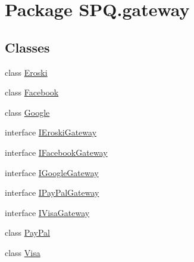 \hypertarget{namespace_s_p_q_1_1gateway}{}\section{Package S\+P\+Q.\+gateway}
\label{namespace_s_p_q_1_1gateway}
\subsection*{Classes}
\begin{DoxyCompactItemize}
\item 
class \mbox{\hyperlink{class_s_p_q_1_1gateway_1_1_eroski}{Eroski}}
\item 
class \mbox{\hyperlink{class_s_p_q_1_1gateway_1_1_facebook}{Facebook}}
\item 
class \mbox{\hyperlink{class_s_p_q_1_1gateway_1_1_google}{Google}}
\item 
interface \mbox{\hyperlink{interface_s_p_q_1_1gateway_1_1_i_eroski_gateway}{I\+Eroski\+Gateway}}
\item 
interface \mbox{\hyperlink{interface_s_p_q_1_1gateway_1_1_i_facebook_gateway}{I\+Facebook\+Gateway}}
\item 
interface \mbox{\hyperlink{interface_s_p_q_1_1gateway_1_1_i_google_gateway}{I\+Google\+Gateway}}
\item 
interface \mbox{\hyperlink{interface_s_p_q_1_1gateway_1_1_i_pay_pal_gateway}{I\+Pay\+Pal\+Gateway}}
\item 
interface \mbox{\hyperlink{interface_s_p_q_1_1gateway_1_1_i_visa_gateway}{I\+Visa\+Gateway}}
\item 
class \mbox{\hyperlink{class_s_p_q_1_1gateway_1_1_pay_pal}{Pay\+Pal}}
\item 
class \mbox{\hyperlink{class_s_p_q_1_1gateway_1_1_visa}{Visa}}
\end{DoxyCompactItemize}

